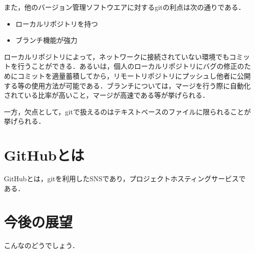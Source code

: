 \documentclass[a4paper,10pt,twocolumn]{jsarticle}
\begin{document}
また，他のバージョン管理ソフトウエアに対するgitの利点は次の通りである．

\begin{itemize}
\item ローカルリポジトリを持つ
\item ブランチ機能が強力
\end{itemize}

ローカルリポジトリによって，ネットワークに接続されていない環境でもコミットを行うことができる．あるいは，個人のローカルリポジトリにバグの修正のためにコミットを適量蓄積してから，リモートリポジトリにプッシュし他者に公開する等の使用方法が可能である．ブランチについては，マージを行う際に自動化されている比率が高いこと，マージが高速である等が挙げられる．

一方，欠点として，gitで扱えるのはテキストベースのファイルに限られることが挙げられる．

\section{GitHubとは}
GitHubとは，gitを利用したSNSであり，プロジェクトホスティングサービスである．

\section{今後の展望}
こんなのどうでしょう．

\small
\begin{thebibliography}{99}
\end{thebibliography}
\end{document}
